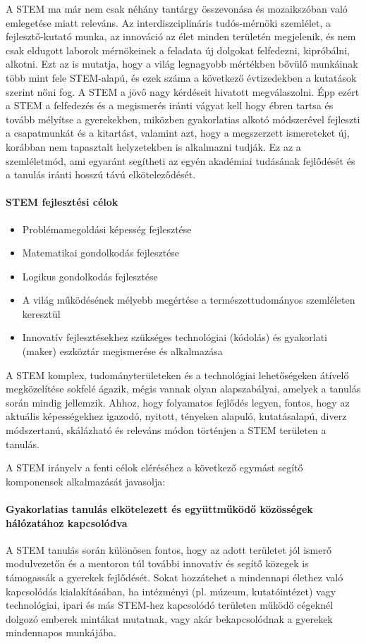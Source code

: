 A STEM ma már nem csak néhány tantárgy összevonása és  mozaikszóban való emlegetése miatt releváns. Az interdiszciplináris tudós-mérnöki szemlélet, a fejlesztő-kutató munka, az innováció az élet minden területén megjelenik, és nem csak eldugott laborok mérnökeinek a feladata új dolgokat felfedezni, kipróbálni, alkotni. Ezt az is mutatja, hogy a világ legnagyobb mértékben bővülő munkáinak több mint fele STEM-alapú, és ezek száma a következő évtizedekben a kutatások szerint nőni fog. A STEM a jövő nagy kérdéseit hivatott megválaszolni. Épp ezért a STEM a felfedezés és a megismerés iránti vágyat kell hogy ébren tartsa és tovább mélyítse a gyerekekben, miközben gyakorlatias alkotó módszerével fejleszti a csapatmunkát és a kitartást, valamint azt, hogy a megszerzett ismereteket új, korábban nem tapasztalt helyzetekben is alkalmazni tudják. Ez az a szemléletmód, ami egyaránt segítheti az egyén akadémiai tudásának fejlődését és a tanulás iránti hosszú távú elköteleződését.

\paragraph{STEM fejlesztési célok}
\begin{itemize}
  \item Problémamegoldási képesség fejlesztése
  \item  Matematikai gondolkodás fejlesztése
  \item  Logikus gondolkodás fejlesztése
  \item  A világ működésének mélyebb megértése a természettudományos szemléleten keresztül
  \item  Innovatív fejlesztésekhez szükséges technológiai (kódolás) és gyakorlati (maker) eszköztár megismerése és alkalmazása
\end{itemize}

A STEM komplex, tudományterületeken és a technológiai lehetőségeken átívelő megközelítése sokfelé ágazik, mégis vannak olyan alapszabályai, amelyek a tanulás során mindig jellemzik. Ahhoz, hogy folyamatos fejlődés legyen, fontos, hogy az aktuális képességekhez igazodó, nyitott, tényeken alapuló, kutatásalapú, diverz módszertanú, skálázható és releváns módon történjen a STEM területen a tanulás.

A STEM irányelv a fenti célok eléréséhez a következő egymást segítő komponensek alkalmazását javasolja:

\paragraph{Gyakorlatias tanulás elkötelezett és együttműködő közösségek hálózatához kapcsolódva}
A STEM tanulás során különösen fontos, hogy az adott területet jól ismerő modulvezetőn és a mentoron túl további innovatív és segítő közegek is támogassák a gyerekek fejlődését. Sokat hozzátehet a mindennapi élethez való kapcsolódás kialakításában, ha intézményi (pl. múzeum, kutatóintézet) vagy technológiai, ipari és más STEM-hez kapcsolódó területen működő cégeknél dolgozó emberek mintákat mutatnak, vagy akár bekapcsolódnak a gyerekek mindennapos munkájába.

